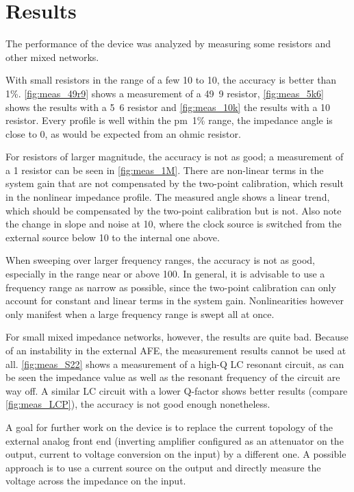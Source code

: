 \chapter{Results} \label{sec:results}

The performance of the device was analyzed by measuring some resistors and other mixed networks.

With small resistors in the range of a few \unit{10}{\ohm} to \unit{10}{\kilo\ohm}, the accuracy is better than
\unit{1}{\%}.
\autoref{fig:meas_49r9} shows a measurement of a \unit{49.9}{\ohm} resistor,
\autoref{fig:meas_5k6} shows the results with a \unit{5.6}{\kilo\ohm} resistor
and \autoref{fig:meas_10k} the results with a \unit{10}{\kilo\ohm} resistor.
Every profile is well within the \unit{\pm 1}{\%} range, the impedance angle is close to 0, as would be expected from
an ohmic resistor.

For resistors of larger magnitude, the accuracy is not as good; a measurement of a \unit{1}{\mega\ohm} resistor can be
seen in \autoref{fig:meas_1M}. There are non-linear terms in the system gain that are not compensated by the two-point
calibration, which result in the nonlinear impedance profile. The measured angle shows a linear trend, which should
be compensated by the two-point calibration but is not.
Also note the change in slope and noise at \unit{10}{\kilo\hertz}, where the clock source is switched from the external
source below \unit{10}{\kilo\hertz} to the internal one above.

When sweeping over larger frequency ranges, the accuracy is not as good, especially in the range near or above
\unit{100}{\kilo\hertz}.
In general, it is advisable to use a frequency range as narrow as possible, since the two-point calibration can only
account for constant and linear terms in the system gain. Nonlinearities however only manifest when a large frequency
range is swept all at once.

For small mixed impedance networks, however, the results are quite bad. Because of  an instability in the external AFE,
the measurement results cannot be used at all. \autoref{fig:meas_S22} shows a measurement of a high-Q LC resonant
circuit, as can be seen the impedance value as well as the resonant frequency of the circuit are way off.
A similar LC circuit with a lower Q-factor shows better results (compare \autoref{fig:meas_LCP}), the accuracy is not
good enough nonetheless.

A goal for further work on the device is to replace the current topology of the external analog front end
(inverting amplifier configured as an attenuator on the output, current to voltage conversion on the input)
by a different one. A possible approach is to use a current source on the output and directly measure the voltage
across the impedance on the input.

